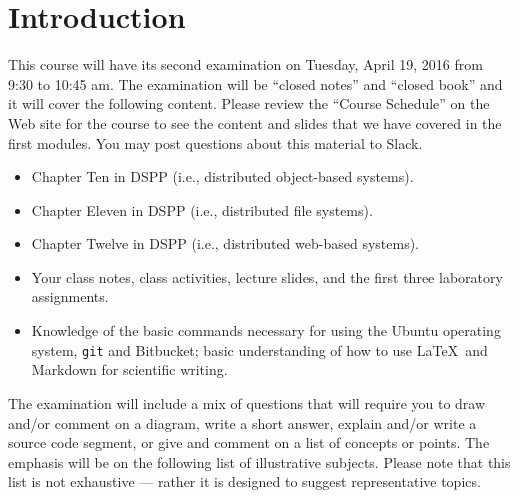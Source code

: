 


\vspace*{-.35in}
\section*{Introduction}
\vspace*{-.05in}

This course will have its second examination on Tuesday, April 19, 2016 from 9:30 to 10:45 am. The examination will
be ``closed notes'' and ``closed book'' and it will cover the following content. Please review the ``Course Schedule''
on the Web site for the course to see the content and slides that we have covered in the first modules. You may post
questions about this material to Slack.

\vspace*{-.05in}

\begin{itemize}

  \itemsep 0in

  \item Chapter Ten in DSPP (i.e., distributed object-based systems).

  \item Chapter Eleven in DSPP (i.e., distributed file systems).

  \item Chapter Twelve in DSPP (i.e., distributed web-based systems).

  \item Your class notes, class activities, lecture slides, and the first three laboratory assignments.

  \item Knowledge of the basic commands necessary for using the Ubuntu operating system, {\tt git} and Bitbucket; basic
    understanding of how to use \LaTeX~and Markdown for scientific writing.

\end{itemize}

\vspace*{-.05in}

\noindent The examination will include a mix of questions that will require you to draw and/or comment on a diagram,
write a short answer, explain and/or write a source code segment, or give and comment on a list of concepts or points.
The emphasis will be on the following list of illustrative subjects. Please note that this list is not exhaustive ---
rather it is designed to suggest representative topics.

